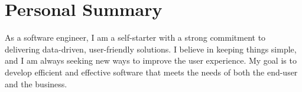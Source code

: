 \documentclass[10pt,a4paper,sans]{moderncv}
\begin{document}
\setlength{\hintscolumnwidth}{0.175\textwidth}  %
\renewcommand*{\hintfont}{\normalsize\mdseries\upshape}

\maketitle

\section{Personal Summary}
  \cvitem
    {}
    {As a software engineer, I am a self-starter with a strong commitment to delivering data-driven, user-friendly solutions. I believe in keeping things simple, and I am always seeking new ways to improve the user experience. My goal is to develop efficient and effective software that meets the needs of both the end-user and the business.}{}





\nocite{*}
%
%
\end{document}
